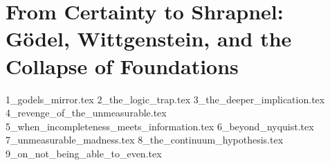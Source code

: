 \section{From Certainty to Shrapnel: Gödel, Wittgenstein, and the Collapse of Foundations}

{1_godels_mirror.tex}
{2_the_logic_trap.tex}
{3_the_deeper_implication.tex}
{4_revenge_of_the_unmeasurable.tex}
{5_when_incompleteness_meets_information.tex}
{6_beyond_nyquist.tex}
{7_unmeasurable_madness.tex}
{8_the_continuum_hypothesis.tex}
{9_on_not_being_able_to_even.tex}